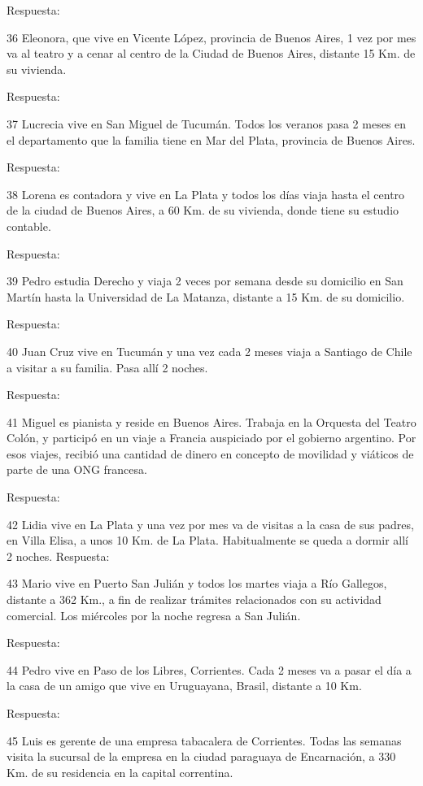 \documentclass[
  openany]{book}
\begin{document}
Respuesta:

36 Eleonora, que vive en Vicente López, provincia de Buenos Aires, 1 vez por mes va al teatro y a cenar al centro de la Ciudad de Buenos Aires, distante 15 Km. de su vivienda.

Respuesta:

37 Lucrecia vive en San Miguel de Tucumán. Todos los veranos pasa 2 meses en el departamento que la familia tiene en Mar del Plata, provincia de Buenos Aires.

Respuesta:

38 Lorena es contadora y vive en La Plata y todos los días viaja hasta el centro de la ciudad de Buenos Aires, a 60 Km. de su vivienda, donde tiene su estudio contable.

Respuesta:

39 Pedro estudia Derecho y viaja 2 veces por semana desde su domicilio en San Martín hasta la Universidad de La Matanza, distante a 15 Km. de su domicilio.

Respuesta:

40 Juan Cruz vive en Tucumán y una vez cada 2 meses viaja a Santiago de Chile a visitar a su familia. Pasa allí 2 noches.

Respuesta:

41 Miguel es pianista y reside en Buenos Aires. Trabaja en la Orquesta del Teatro Colón, y participó en un viaje a Francia auspiciado por el gobierno argentino. Por esos viajes, recibió una cantidad de dinero en concepto de movilidad y viáticos de parte de una ONG francesa.

Respuesta:

42 Lidia vive en La Plata y una vez por mes va de visitas a la casa de sus padres, en Villa Elisa, a unos 10 Km. de La Plata. Habitualmente se queda a dormir allí 2 noches. Respuesta:

43 Mario vive en Puerto San Julián y todos los martes viaja a Río Gallegos, distante a 362 Km., a fin de realizar trámites relacionados con su actividad comercial. Los miércoles por la noche regresa a San Julián.

Respuesta:

44 Pedro vive en Paso de los Libres, Corrientes. Cada 2 meses va a pasar el día a la casa de un amigo que vive en Uruguayana, Brasil, distante a 10 Km.

Respuesta:

45 Luis es gerente de una empresa tabacalera de Corrientes. Todas las semanas visita la sucursal de la empresa en la ciudad paraguaya de Encarnación, a 330 Km. de su residencia en la capital correntina.
\end{document}
